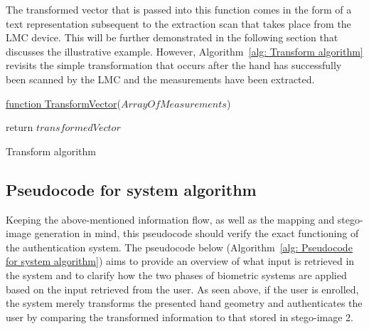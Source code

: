 The transformed vector that is passed into this function comes in the form of a text representation subsequent to the extraction scan that takes place from the LMC device. This will be further demonstrated in the following section that discusses the illustrative example. However, Algorithm~\ref{alg: Transform algorithm} revisits the simple transformation that occurs after the hand has successfully been scanned by the LMC and the measurements have been extracted. 


\begin{algorithm}
     
     \underline{function TransformVector}($ArrayOfMeasurements$)\;
     
     
     return $transformedVector$\;
     \caption{Transform algorithm}
     \label{alg: Transform algorithm}
     
\end{algorithm}








\subsection{Pseudocode for system algorithm}

Keeping the above-mentioned information flow, as well as the mapping and stego-image generation in mind, this pseudocode should verify the exact functioning of the authentication system. 
The pseudocode below (Algorithm~\ref{alg: Pseudocode for system algorithm}) aims to provide an overview of what input is retrieved in the system and to clarify how the two phases of biometric systems are applied based on the input retrieved from the user. As seen above, if the user is enrolled, the system merely transforms the presented hand geometry and authenticates the user by comparing the transformed information to that stored in stego-image 2.

